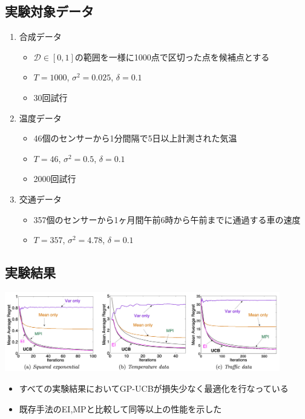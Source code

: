 \documentclass[dvipdfmx, 10.5pt]{beamer}
\begin{document}
\subsection{実験対象データ}
\begin{frame}{\insertsubsection}
	\begin{enumerate}
		\item 合成データ
		\begin{itemize}
			\item $\mathcal{D} \in [0,1]$の範囲を一様に1000点で区切った点を候補点とする
			\item $T = 1000$, $\sigma^2 = 0.025$, $\delta = 0.1$
			\item 30回試行
		\end{itemize}
		\item 温度データ
		\begin{itemize}
			\item 46個のセンサーから1分間隔で5日以上計測された気温
			\item $T = 46$, $\sigma^2 = 0.5$, $\delta = 0.1$
			\item 2000回試行
		\end{itemize}
		\item 交通データ
		\begin{itemize}
			\item 357個のセンサーから1ヶ月間午前6時から午前までに通過する車の速度
			\item $T = 357$, $\sigma^2 = 4.78$, $\delta = 0.1$
		\end{itemize}
	\end{enumerate}
\end{frame}


\subsection{実験結果}

\begin{frame}{\insertsubsection}
	\begin{center}
		\includegraphics[width=0.90\textwidth]{./Fig/Figure4.pdf}
	\end{center}
	\begin{itemize}
		\item すべての実験結果においてGP-UCBが損失少なく最適化を行なっている
		\item 既存手法のEI,MPと比較して同等以上の性能を示した
	\end{itemize}

\end{frame}
\end{document}
